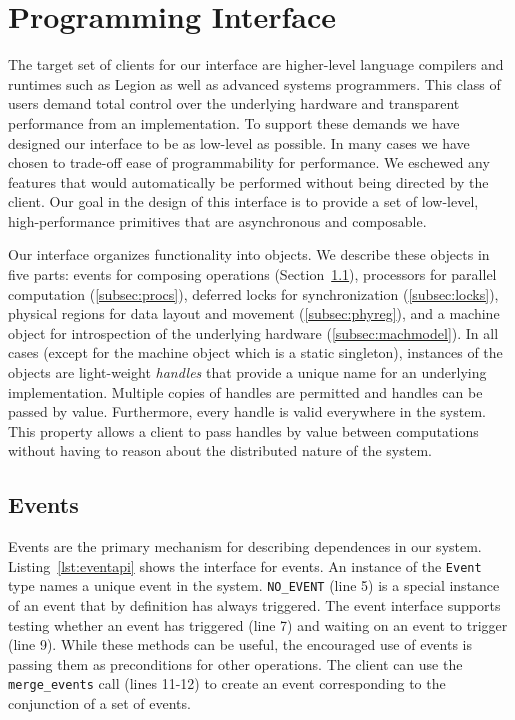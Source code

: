 
\section{Programming Interface}
\label{sec:interface}
The target set of clients for our interface are higher-level language
compilers and runtimes such as Legion\cite{Legion12} as well as 
advanced systems programmers.  This class of users demand total control
over the underlying hardware and transparent performance from an
implementation.  To support these demands we have designed our interface
to be as low-level as possible.  In many cases we have chosen to trade-off
ease of programmability for performance.  We eschewed any features that would
automatically be performed without being directed by the client.
Our goal in the design of this interface is to provide a set of low-level,
high-performance primitives that are asynchronous and composable.

Our interface organizes functionality into objects.  We describe
these objects in five parts: events for composing operations 
(Section~\ref{subsec:events}), processors for parallel computation 
(\ref{subsec:procs}), deferred locks for synchronization
(\ref{subsec:locks}), physical regions for data layout and movement
(\ref{subsec:phyreg}), and a machine object for introspection of the underlying
hardware (\ref{subsec:machmodel}).  In all cases (except for the
machine object which is a static singleton), instances of the objects
are light-weight {\em handles} that provide a unique name for an underlying
implementation.  Multiple copies of handles are permitted and handles can be 
passed by value.  Furthermore, every handle is valid everywhere in the system.  
This property allows a client to pass handles by value between computations 
without having to reason about the distributed nature of the system.

\lstset{
  captionpos=b,
  language=C++,
  basicstyle=\scriptsize,
  numbers=left,
  numberstyle=\tiny,
  columns=fullflexible,
  stepnumber=1,
  escapechar=\#,
  keepspaces=true,
}

\subsection{Events}
\label{subsec:events}
Events are the primary mechanism for describing dependences in our system.
Listing~\ref{lst:eventapi} shows the interface for events.  An instance of the {\tt Event} type 
names a unique event in the system.  {\tt NO\_EVENT} (line 5) is a special instance
of an event that by definition has always triggered.  The event interface
supports testing whether an event has triggered (line 7) and waiting on
an event to trigger (line 9).  While these methods can be useful, the encouraged
use of events is passing them as preconditions for other operations.  The client can use the
{\tt merge\_events} call (lines 11-12) to create an event corresponding to the 
conjunction of a set of events.


